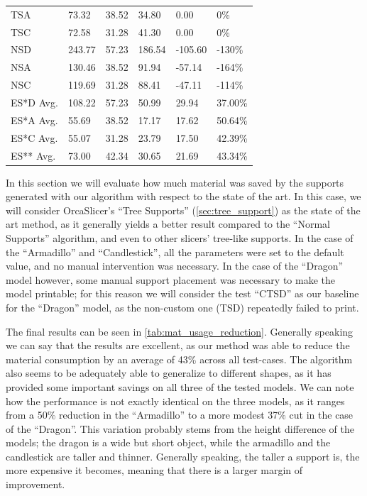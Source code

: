 \begin{table}[ht]
\begin{tabular}{llllll}
        TSA & 73.32 & 38.52 & 34.80 & 0.00 & 0\% \\
        TSC & 72.58 & 31.28 & 41.30 & 0.00 & 0\% \\ \midrule
        NSD & 243.77 & 57.23 & 186.54 & -105.60 & -130\% \\
        NSA & 130.46 & 38.52 & 91.94 & -57.14 & -164\% \\
        NSC & 119.69 & 31.28 & 88.41 & -47.11 & -114\% \\ \midrule
        ES*D Avg. & 108.22 & 57.23 & 50.99 & 29.94 & 37.00\% \\ 
        ES*A Avg. & 55.69 & 38.52 & 17.17 & 17.62 & 50.64\% \\ 
        ES*C Avg. & 55.07 & 31.28 & 23.79 & 17.50 & 42.39\% \\ 
        ES** Avg. & 73.00 & 42.34 & 30.65 & 21.69 & 43.34\% \\ 
    \bottomrule
    \end{tabular}
\end{table}



In this section we will evaluate how much material was saved by the supports generated with 
our algorithm with respect to the state of the art. In this case, we will consider OrcaSlicer's
``Tree Supports'' (\cref{sec:tree_support}) as the state of the art method, as it generally yields
a better result compared to the ``Normal Supports'' algorithm, and even to other slicers'
tree-like supports. In the case of the ``Armadillo'' and ``Candlestick'', all the parameters
were set to the default value, and no manual intervention was necessary.
In the case of the ``Dragon'' model however, some manual support placement was necessary
to make the model printable; for this reason we will consider the test ``CTSD'' as our baseline
for the ``Dragon'' model, as the non-custom one (TSD) repeatedly failed to print.

The final results can be seen in \cref{tab:mat_usage_reduction}.
Generally speaking we can say that the results are excellent, as our method was able to
reduce the material consumption by an average of 43\% across all test-cases.
The algorithm also seems to be adequately able to generalize to different shapes,
as it has provided some important savings on all three of the tested models.
We can note how the performance is not exactly identical on the three models,
as it ranges from a 50\% reduction in the ``Armadillo'' to a more modest 37\% 
cut in the case of the ``Dragon''. This variation probably stems
from the height difference of the models; the dragon is a wide but short
object, while the armadillo and the candlestick are taller and thinner.
Generally speaking, the taller a support is, the more expensive it becomes,
meaning that there is a larger margin of improvement.



